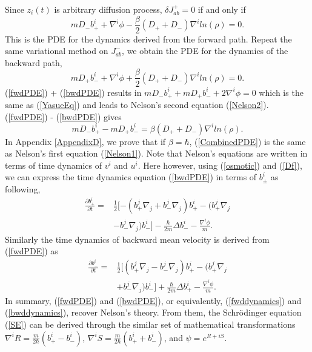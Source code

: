 \documentclass[%
 aip, 
 amsmath,amssymb,amsthm,
 nofootinbib,
 reprint,
]{revtex4-1}
\begin{document}
Since $z_i(t)$ is arbitrary diffusion process, $\delta J_{ab}^+=0$ if and only if
\begin{equation}
    \label{fwdPDE}
    mD_-b_+^i +\nabla^i\phi - \frac{\beta}{2}(D_+ + D_-)\nabla^i ln(\rho) =0.
\end{equation}
This is the PDE for the dynamics derived from the forward path. Repeat the same variational method on $J_{ab}^-$, we obtain the PDE for the dynamics of the backward path,
\begin{equation}
    \label{bwdPDE}
    mD_+b_-^i +\nabla^i\phi + \frac{\beta}{2}(D_+ + D_-)\nabla^i ln(\rho) =0.
\end{equation}
(\ref{fwdPDE}) + (\ref{bwdPDE}) results in $mD_-b_+^i + mD_+b_-^i +2\nabla^i\phi = 0$ which is the same as (\ref{YasueEq}) and leads to Nelson's second equation (\ref{Nelson2}). (\ref{fwdPDE}) - (\ref{bwdPDE}) gives
\begin{equation}
    \label{CombinedPDE}
    mD_-b_+^i - mD_+b_-^i = \beta(D_+ + D_-)\nabla^i ln(\rho).
\end{equation}
In Appendix \ref{AppendixD}, we prove that if $\beta=\hbar$, (\ref{CombinedPDE}) is the same as Nelson's first equation (\ref{Nelson1}). Note that Nelson's equations are written in terms of time dynamics of $v^i$ and $u^i$. Here however, using (\ref{osmotic}) and (\ref{Df}), we can express the time dynamics equation (\ref{bwdPDE}) in terms of $b_{\pm}^i$ as following,
\begin{equation}
    \label{fwddynamics}
    \begin{split}
       \frac{\partial b_+^i}{\partial t} =& \frac{1}{2}[-(b_+^j\nabla_j + b_-^j\nabla_j)b_+^i- (b_+^j\nabla_j \\
       &-b_-^j\nabla_j) b_-^i] - \frac{\hbar}{2m}\Delta b_-^i -\frac{\nabla^i\phi}{m}.
    \end{split}
\end{equation}
Similarly the time dynamics of backward mean velocity is derived from (\ref{fwdPDE}) as
\begin{equation}
    \label{bwddynamics}
    \begin{split}
       \frac{\partial b_-^i}{\partial t} =& \frac{1}{2}[(b_+^j\nabla_j - b_-^j\nabla_j)b_+^i- (b_+^j\nabla_j \\
       &+b_-^j\nabla_j) b_-^i] + \frac{\hbar}{2m}\Delta b_+^i -\frac{\nabla^i\phi}{m}.
    \end{split}
\end{equation}
In summary, (\ref{fwdPDE}) and (\ref{bwdPDE}), or equivalently, (\ref{fwddynamics}) and (\ref{bwddynamics}), recover Nelson's theory. From them, the Schr\"{o}dinger equation (\ref{SE}) can be derived through the similar set of mathematical transformations $\nabla^iR=\frac{m}{2\hbar}(b_+^i-b_-^i)$, $\nabla^i S=\frac{m}{2\hbar}(b_+^i+b_-^i)$, and $\psi=e^{R+iS}$.
\end{document}
